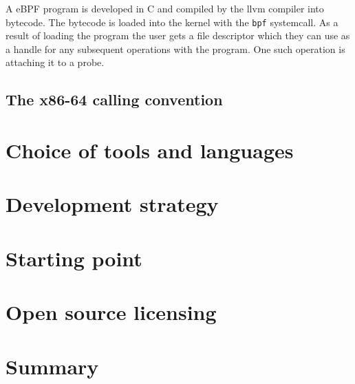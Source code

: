         A eBPF program is developed in C and compiled by the llvm compiler into bytecode. The bytecode is loaded into the kernel with the \texttt{bpf} systemcall. As a result of loading the program the user gets a file descriptor which they can use as a handle for any subsequent operations with the program. One such operation is attaching it to a probe.

    \subsection{The x86-64 calling convention}


\section{Choice of tools and languages}


\section{Development strategy}

\section{Starting point}

\section{Open source licensing}

\section{Summary}
